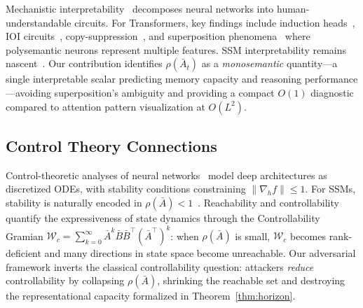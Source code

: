 \documentclass[10pt,twocolumn]{article}
\begin{document}
Mechanistic interpretability~\cite{olah2020zoom,elhage2021mathematical} decomposes neural networks into human-understandable circuits. For Transformers, key findings include induction heads~\cite{olsson2022context}, IOI circuits~\cite{wang2022interpretability}, copy-suppression~\cite{mcdougall2023copy}, and superposition phenomena~\cite{elhage2022toy} where polysemantic neurons represent multiple features. SSM interpretability remains nascent~\cite{bereska2024mechanistic}. Our contribution identifies $\rho(\bar{A}_t)$ as a \emph{monosemantic} quantity---a single interpretable scalar predicting memory capacity and reasoning performance---avoiding superposition's ambiguity and providing a compact $O(1)$ diagnostic compared to attention pattern visualization at $O(L^2)$.

\subsection{Control Theory Connections}

Control-theoretic analyses of neural networks~\cite{haber2017stable,ruthotto2020deep} model deep architectures as discretized ODEs, with stability conditions constraining $\|\nabla_h f\| \le 1$. For SSMs, stability is naturally encoded in $\rho(\bar{A})<1$~\cite{orvieto2023resurrecting}. Reachability and controllability~\cite{kalman1960contributions} quantify the expressiveness of state dynamics through the Controllability Gramian $\mathcal{W}_c = \sum_{k=0}^{\infty} \bar{A}^k \bar{B}\bar{B}^\top (\bar{A}^\top)^k$: when $\rho(\bar{A})$ is small, $\mathcal{W}_c$ becomes rank-deficient and many directions in state space become unreachable. Our adversarial framework inverts the classical controllability question: attackers \emph{reduce} controllability by collapsing $\rho(\bar{A})$, shrinking the reachable set and destroying the representational capacity formalized in Theorem~\ref{thm:horizon}.
\end{document}
